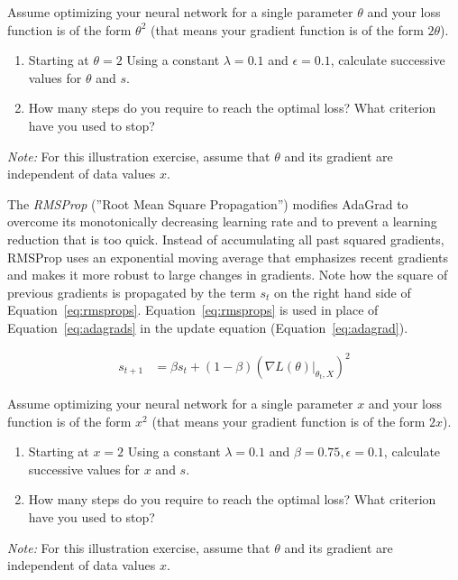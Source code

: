 \begin{exerciseboxpaper}
Assume optimizing your neural network for a single parameter $\theta$ and your loss function is of the form $\theta^2$ (that means your gradient function is of the form $2\theta$). 

\begin{enumerate}
   \item Starting at $\theta=2$ Using a constant $\lambda = 0.1$ and $\epsilon=0.1$, calculate successive values for $\theta$ and $s$. 
   \item How many steps do you require to reach the optimal loss? What criterion have you used to stop?
\end{enumerate}

\emph{Note:} For this illustration exercise, assume that $\theta$ and its gradient are independent of data values $x$.
\end{exerciseboxpaper}

The \emph{RMSProp} (''Root Mean Square Propagation'') modifies AdaGrad to overcome its monotonically decreasing learning rate and to prevent a learning reduction that is too quick. Instead of accumulating all past squared gradients, RMSProp uses an exponential moving average that emphasizes recent gradients and makes it more robust to large changes in gradients. Note how the square of previous gradients is propagated by the term $s_t$ on the right hand side of Equation~\ref{eq:rmsprops}. Equation~\ref{eq:rmsprops} is used in place of Equation~\ref{eq:adagrads} in the update equation (Equation~\ref{eq:adagrad}).

\begin{align}
s_{t+1} &= \beta s_t + (1-\beta) \left( \nabla L(\theta)\rvert_{\theta_t, X}\right)^2 \label{eq:rmsprops}
\end{align}

\begin{exerciseboxpaper}
Assume optimizing your neural network for a single parameter $x$ and your loss function is of the form $x^2$ (that means your gradient function is of the form $2x$). 

\begin{enumerate}
   \item Starting at $x=2$ Using a constant $\lambda = 0.1$ and $\beta=0.75, \epsilon=0.1$, calculate successive values for $x$ and $s$. 
   \item How many steps do you require to reach the optimal loss? What criterion have you used to stop?
\end{enumerate}

\emph{Note:} For this illustration exercise, assume that $\theta$ and its gradient are independent of data values $x$.
\end{exerciseboxpaper}

